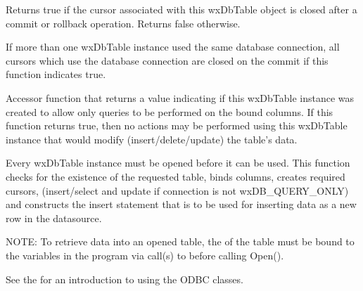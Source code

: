 
Returns true if the cursor associated with this wxDbTable object is closed
after a commit or rollback operation.  Returns false otherwise.


If more than one wxDbTable instance used the same database connection, all cursors
which use the database connection are closed on the commit if this function
indicates true.

\label{wxdbtableisqueryonly}


Accessor function that returns a value indicating if this wxDbTable instance
was created to allow only queries to be performed on the bound columns.  If
this function returns true, then no actions may be performed using this
wxDbTable instance that would modify (insert/delete/update) the table's data.

\label{wxdbtableopen}


Every wxDbTable instance must be opened before it can be used.  This function
checks for the existence of the requested table, binds columns, creates required
cursors, (insert/select and update if connection is not wxDB\_QUERY\_ONLY) and
constructs the insert statement that is to be used for inserting data as a new
row in the datasource.

NOTE: To retrieve data into an opened table, the of the table must be bound
to the variables in the program via call(s) to 
 before calling Open().

See the  for
an introduction to using the ODBC classes.





